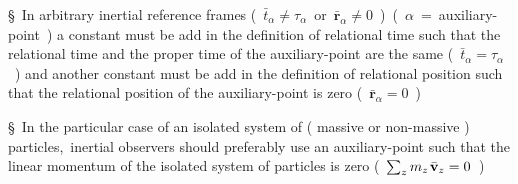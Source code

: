 \documentclass[10pt,fleqn]{article}
\begin{document}
\vspace{-0.60em}

\par {}

\bigskip \smallskip

\noindent \S \ In arbitrary inertial reference frames \hbox {{\small ( $\bar{t}_{\alpha} \ne \tau_{\alpha}$ or $\bar{\mathbf{r}}_{\alpha} \ne 0$ ) ( $\alpha$ = auxiliary-point )}} a constant must be add in the definition of relational time such that the relational time and the proper time of the auxiliary-point are the same \hbox {{\small ( $\bar{t}_{\alpha} = \tau_{\alpha}$ )}} and another constant must be add in the definition of relational position such that the relational position of the auxiliary-point is zero \hbox {{\small ( $\bar{\mathbf{r}}_{\alpha} = 0$ )}}
\par \bigskip \smallskip
\noindent \S \ In the particular case of an isolated system of ( massive or non-massive ) \hbox {particles, inertial} observers should preferably use an auxiliary-point such that the linear momentum of the isolated system of particles is zero \hbox {{\small ( $\sum_z m_z \hspace{+0.09em} \bar{\mathbf{v}}_z = 0$ )}}

\newpage

\par {}

\bigskip \smallskip
\end{document}
